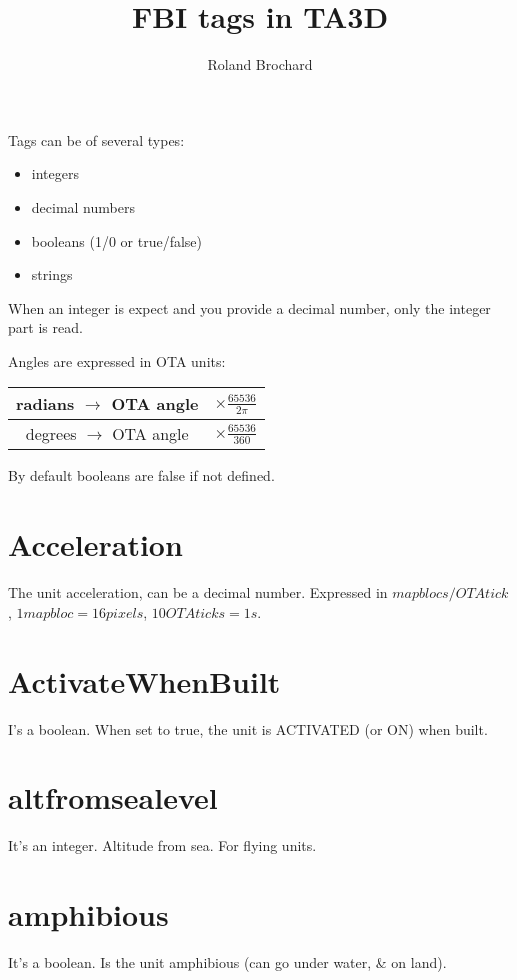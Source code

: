 \documentclass[a4paper,10pt]{article}
\title{FBI tags in TA3D}
\author{Roland Brochard}
\date{}
\begin{document}
\maketitle


\pagebreak

Tags can be of several types:
\begin{itemize}
 \item integers
 \item decimal numbers
 \item booleans (1/0 or true/false)
 \item strings
\end{itemize}
When an integer is expect and you provide a decimal number, only the integer part is read.

Angles are expressed in OTA units:\\
\begin{tabular}{|c|c|}
 \hline
 radians $\rightarrow$ OTA angle & $\times \frac{65536}{2 \pi}$ \\
 \hline
 degrees $\rightarrow$ OTA angle & $\times \frac{65536}{360}$ \\
 \hline
\end{tabular}


By default booleans are false if not defined.

\section{Acceleration}
The unit acceleration, can be a decimal number. Expressed in $map blocs/OTA tick$, $1 map bloc = 16 pixels$, $10 OTA ticks = 1s$.

\section{ActivateWhenBuilt}
I's a boolean. When set to true, the unit is ACTIVATED (or ON) when built.

\section{altfromsealevel}
It's an integer. Altitude from sea. For flying units.

\section{amphibious}
It's a boolean.
Is the unit amphibious (can go under water, \& on land).
\end{document}
